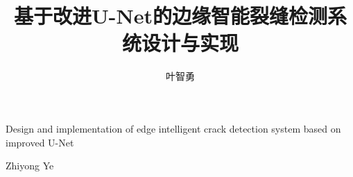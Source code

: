\title{基于改进U-Net的边缘智能裂缝检测系统设计与实现}{Design and implementation of edge intelligent crack detection system based on improved U-Net}

\author{叶智勇}{Zhiyong Ye}

\makecover
